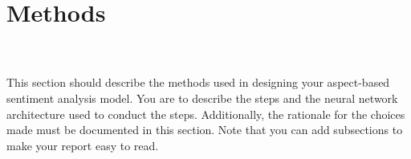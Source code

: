 \section{Methods}
\textbf{}\\\\
This section should describe the methods used in designing your aspect-based sentiment analysis model. You are to describe the steps and the neural network architecture used to conduct the steps. Additionally, the rationale for the choices made must be documented in this section.
Note that you can add subsections to make your report easy to read.
